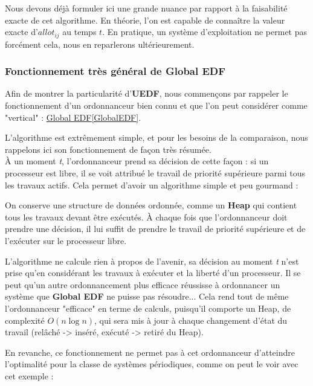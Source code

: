 	Nous devons déjà formuler ici une grande nuance par rapport à la faisabilité exacte de cet algorithme. 
	En théorie, l'on est capable de connaître la valeur exacte d'$allot_{ij}$ au temps $t$. En pratique, 
	un système d'exploitation ne permet pas forcément cela, nous en reparlerons ultérieurement.
	
	\newpage

		\subsubsection{Fonctionnement très général de Global EDF}
		Afin de montrer la particularité d'\textbf{UEDF}, nous commençons par rappeler le fonctionnement 
		d'un ordonnanceur bien connu et que l'on peut considérer comme "vertical" : \hyperref[GlobalEDF]{Global EDF}\ref*{GlobalEDF}.
		
		L'algorithme est extrêmement simple, et pour les besoins de la comparaison, nous rappelons 
		ici son fonctionnement de façon très résumée.\\
		À un moment \textit{t}, l'ordonnanceur prend sa décision de cette façon :
		si un processeur est libre, il se voit attribué le travail de priorité supérieure parmi 
		tous les travaux actifs. Cela permet d'avoir un algorithme simple et peu gourmand :\newline
		
		On conserve une structure de données 
		ordonnée, comme un \textbf{Heap}  qui contient tous les travaux
		devant être exécutés. À chaque fois que l'ordonnanceur doit prendre 
		une décision, il lui suffit de prendre le travail de priorité supérieure et 
		de l'exécuter sur le processeur libre.
		
		L'algorithme ne calcule rien à propos de l'avenir, sa décision au moment \textit{t}
		n'est prise qu'en considérant les travaux à exécuter et la liberté d'un 
		processeur. Il se peut qu'un autre ordonnancement plus efficace 
		réussisse à ordonnancer un système que \textbf{Global EDF} ne puisse pas résoudre...
		Cela rend tout de même l'ordonnanceur "efficace" en terme de calculs, 
		puisqu'il comporte un Heap, de complexité $O(n\log n)$, qui sera mis à jour 
		à chaque changement d'état du travail (relâché -> inséré, 
		exécuté -> retiré du Heap).
		
		En revanche, ce fonctionnement ne permet pas à cet ordonnanceur d'atteindre 
		l'optimalité pour la classe de systèmes périodiques, comme on peut le voir 
		avec cet exemple :

